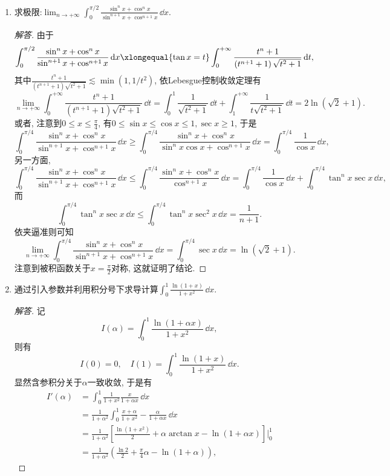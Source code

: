\begin{a}
\begin{enumerate}
\item 求极限:\(\lim_{n\rightarrow+\infty}\int_{0}^{\pi/2}\frac{\sin^n x+\cos^nx}{\sin^{n+1}x+\cos^{n+1}x}\,\dd x.\)
\begin{proof}[解答]
由于\[\int_{0}^{\pi/2}\frac{\sin^n x+\cos^nx}{\sin^{n+1}x+\cos^{n+1}x}\,\dd x
\xlongequal{\tan x=t}\int_{0}^{+\infty}\frac{t^n+1}{\left(t^{n+1}+1\right)\sqrt{t^2+1}}\,\dd t,\]
其中\(\frac{t^n+1}{\left(t^{n+1}+1\right)\sqrt{t^2+1}}\lesssim\min(1,1/t^2)\), 依Lebesgue控制收敛定理有
\[\lim_{n\rightarrow+\infty}\int_{0}^{+\infty}\frac{t^n+1}{\left(t^{n+1}+1\right)\sqrt{t^2+1}}\,\dd t
=\int_{0}^{1}\frac{1}{\sqrt{t^2+1}}\,\dd t+\int_{1}^{+\infty}\frac{1}{t\sqrt{t^2+1}}\,\dd t=2\ln(\sqrt{2}+1).\]
或者, 注意到\(0\leqslant x\leqslant\frac{\pi}{4}\), 有\(0\leqslant \sin x\leqslant\cos x\leqslant 1,\sec x\geqslant 1\), 于是
\[\int_{0}^{\pi/4}\frac{\sin^nx+\cos^nx}{\sin^{n+1}x+\cos^{n+1}x}\,\dd x
\geqslant\int_{0}^{\pi/4}\frac{\sin^nx+\cos^nx}{\sin^nx\cos x+\cos^{n+1}x}\,\dd x
=\int_{0}^{\pi/4}\frac{1}{\cos x\,}\dd x,\]
另一方面,
\[\int_{0}^{\pi/4}\frac{\sin^nx+\cos^nx}{\sin^{n+1}x+\cos^{n+1}x}\,\dd x
\leqslant\int_{0}^{\pi/4}\frac{\sin^nx+\cos^nx}{\cos^{n+1}x}\,\dd x
=\int_{0}^{\pi/4}\frac{1}{\cos x}\,\dd x+\int_{0}^{\pi/4}\tan^nx\sec x\,\dd x,\]
而\[\int_{0}^{\pi/4}\tan^nx\sec x\,\dd x\leqslant\int_{0}^{\pi/4}\tan^nx\sec^2 x\,\dd x=\frac{1}{n+1}.\]
依夹逼准则可知\[\lim_{n\rightarrow+\infty}\int_{0}^{\pi/4}\frac{\sin^nx+\cos^nx}{\sin^{n+1}x+\cos^{n+1}x}\,\dd x
=\int_{0}^{\pi/4}\sec x\,\dd x=\ln(\sqrt{2}+1).\]
注意到被积函数关于\(x=\frac{\pi}{2}\)对称, 这就证明了结论. 
\end{proof}
\item 通过引入参数并利用积分号下求导计算\(\int_{0}^{1}\frac{\ln (1+x)}{1+x^2}\,\dd x\).
\begin{proof}[解答]
记\[I(\alpha)=\int_{0}^{1}\frac{\ln(1+\alpha x)}{1+x^2}\,\dd x,\]
则有\[I(0)=0,\quad I(1)=\int_{0}^{1}\frac{\ln(1+x)}{1+x^2}\,\dd x.\]
显然含参积分关于\(\alpha\)一致收敛, 于是有
\begin{align*}I'(\alpha)&=\int_{0}^{1}\frac{1}{1+x^2}\frac{x}{1+\alpha x}\,\dd x\\
&=\frac{1}{1+\alpha^2}\int_0^1\frac{x+\alpha}{1+x^2}-\frac{\alpha}{1+\alpha x}\,\dd x\\
&=\frac{1}{1+\alpha^2}\left[\frac{\ln(1+x^2)}{2}+\alpha\arctan x-\ln(1+\alpha x)\right]\bigg|_0^1\\
&=\frac{1}{1+\alpha^2}\left(\frac{\ln 2}{2}+\frac{\pi}{4}\alpha-\ln(1+\alpha)\right),\end{align*}

\end{proof}
\end{enumerate}
\end{a}
